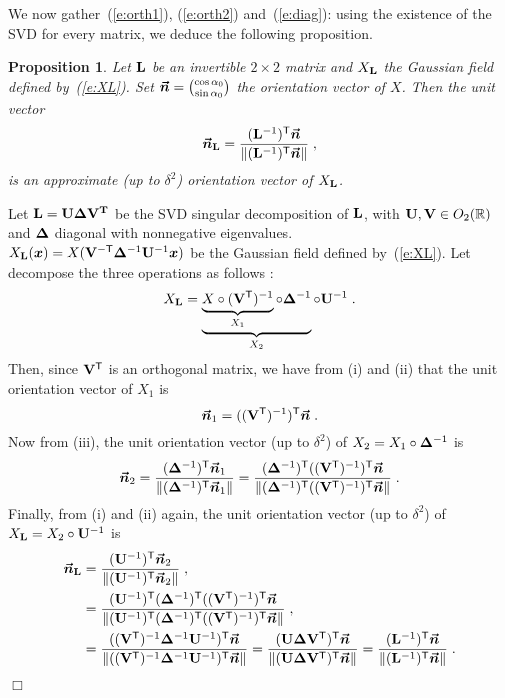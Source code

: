 \documentclass{elsarticle}
\newtheorem{proposition}{Proposition}
\newenvironment{proof}{\medskip\noindent{\bf Proof.}\;}{\null\hfill $\Box$\par\medskip }
\begin{document}
We now gather~(\ref{e:orth1}), (\ref{e:orth2}) and~(\ref{e:diag}): using the existence of the SVD for every matrix, we deduce the following proposition.
%
\begin{proposition}\label{prop:orientation_vector}
Let $\mathbf{L}$ be an invertible $2\times 2$ matrix and $X_{\mathbf{L}}$ the Gaussian field defined by~(\ref{e:XL}). Set $\bm{\vec n}=\binom{\cos \alpha_0}{\sin\alpha_0}$ the orientation vector of $X$. Then the unit vector 
\[
\bm{\vec n}_{\mathbf{L}}=\frac{(\mathbf{L}^{-1})^{\mathsf{T}}\bm{\vec n}}{\lVert (\mathbf{L}^{-1})^{\mathsf{T}} \bm{\vec n}\rVert}\;,
\]
is an approximate (up to $\delta^2$) orientation vector of $X_{\mathbf{L}}$.
\end{proposition}
\begin{proof} Let $\mathbf{L}=\mathbf{U}\mathbf{\Delta} \mathbf{V^T}$ be the SVD singular decomposition of $\mathbf{L}$,  with $\mathbf{U}, \mathbf{V}\in O_2(\mathbb{R})$ and $\mathbf{\Delta}$ diagonal with nonnegative eigenvalues.\\
 $X_{\mathbf{L}}(\bm{x})=X(\mathbf{V}^{-\mathsf{T}}\mathbf{\Delta}^{-1}\mathbf{U}^{-1}\bm{x})$ be the Gaussian field defined by~(\ref{e:XL}). Let decompose the three operations as follows	:
 \[
X_{\mathbf{L}}=\underbrace{\underbrace{X\circ (\mathbf{V}^{\mathsf{T}})^{-1}}_{X_1}\circ \mathbf{\Delta}^{-1}}_{X_2}\circ \mathbf{U}^{-1}\;.
\]
Then, since $\mathbf{V}^{\mathsf{T}}$ is an orthogonal matrix, we have from (i) and (ii) that the unit orientation vector of $X_1$ is 
\[
\bm{\vec n}_{1} = ((\mathbf{V}^{\mathsf{T}})^{-1})^{\mathsf{T}} \bm{\vec n}\;.
\]
Now from (iii), the unit orientation vector (up to $\delta^2$) of $X_2=X_1\circ \mathbf{\Delta}^{-1}$ is
\[
\bm{\vec n}_{2} = \frac{(\mathbf{\Delta}^{-1})^{\mathsf{T}}\bm{\vec n}_{1}}{\lVert (\mathbf{\Delta}^{-1})^{\mathsf{T}}\bm{\vec n}_{1}\rVert} = \frac{(\mathbf{\Delta}^{-1})^{\mathsf{T}}((\mathbf{V}^{\mathsf{T}})^{-1})^{\mathsf{T}} \bm{\vec n}}{\lVert (\mathbf{\Delta}^{-1})^{\mathsf{T}}((\mathbf{V}^{\mathsf{T}})^{-1})^{\mathsf{T}} \bm{\vec n}\rVert}\;.
\]
Finally, from (i) and (ii) again, the unit orientation vector (up to $\delta^2$) of $X_{\mathbf{L}}=X_2\circ \mathbf{U}^{-1}$ is
\begin{align*}
\bm{\vec n}_{\mathbf{L}}
&= \frac{( \mathbf{U}^{-1})^{\mathsf{T}} \bm{\vec n}_{2}}{\lVert ( \mathbf{U}^{-1})^{\mathsf{T}} \bm{\vec n}_{2}\rVert}\;,\\
&=\frac{ (\mathbf{U}^{-1})^{\mathsf{T}} (\mathbf{\Delta}^{-1})^{\mathsf{T}}((\mathbf{V}^{\mathsf{T}})^{-1})^{\mathsf{T}} \bm{\vec n}}{\lVert (\mathbf{U}^{-1})^{\mathsf{T}} (\mathbf{\Delta}^{-1})^{\mathsf{T}}((\mathbf{V}^{\mathsf{T}})^{-1})^{\mathsf{T}} \bm{\vec n}\rVert}\;,\\
&=\frac{ ((\mathbf{V}^{\mathsf{T}})^{-1}\mathbf{\Delta}^{-1}\mathbf{U}^{-1})^{\mathsf{T}} \bm{\vec n}}{\lVert ((\mathbf{V}^{\mathsf{T}})^{-1}\mathbf{\Delta}^{-1}\mathbf{U}^{-1})^{\mathsf{T}} \bm{\vec n}\rVert}=\frac{ (\mathbf{U}\mathbf{\Delta}\mathbf{V}^{\mathsf{T}})^{\mathsf{T}} \bm{\vec n}}{\lVert (\mathbf{U}\mathbf{\Delta}\mathbf{V}^{\mathsf{T}})^{\mathsf{T}} \bm{\vec n} \rVert}=\frac{(\mathbf{L}^{-1})^{\mathsf{T}}\bm{\vec n}}{\lVert (\mathbf{L}^{-1})^{\mathsf{T}} \bm{\vec n}\rVert}\;.
\end{align*}



\end{proof}
\end{document}
